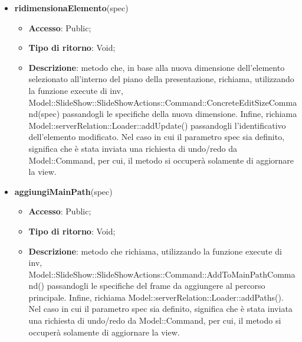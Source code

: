 {{\begin{itemize}
\begin{itemize}
			\item \textbf{Descrizione}: metodo che, in base al nuovo posizionamento dell'elemento selezionato all'interno del piano della presentazione, richiama, utilizzando la funzione execute di inv, Model::\-SlideShow::\-SlideShowActions::\-Command::\-ConcreteEditPositionCommand() passandogli le specifiche della nuova posizione. Infine, richiama Model::\-serverRelation::\-Loader::\-addUpdate() passandogli l'identificativo dell'elemento modificato. Nel caso in cui il parametro spec sia definito, significa che è stata inviata una richiesta di undo/redo da Model::\-Command, per cui, il metodo si occuperà solamente di aggiornare la view.
		\end{itemize}
		\item \textbf{ridimensionaElemento}(spec)
		\begin{itemize}
			\item \textbf{Accesso}: Public;
			\item \textbf{Tipo di ritorno}: Void;
			\item \textbf{Descrizione}: metodo che, in base alla nuova dimensione dell'elemento selezionato all'interno del piano della presentazione, richiama, utilizzando la funzione execute di inv, Model::\-SlideShow::\-SlideShowActions::\-Command::\-ConcreteEditSizeCommand(spec) passandogli le specifiche della nuova dimensione. Infine, richiama Model::\-serverRelation::\-Loader::\-addUpdate() passandogli l'identificativo dell'elemento modificato. Nel caso in cui il parametro spec sia definito, significa che è stata inviata una richiesta di undo/redo da Model::\-Command, per cui, il metodo si occuperà solamente di aggiornare la view.
		\end{itemize}
		\item \textbf{aggiungiMainPath}(spec)
		\begin{itemize}
			\item \textbf{Accesso}: Public;
			\item \textbf{Tipo di ritorno}: Void;
			\item \textbf{Descrizione}: metodo che richiama, utilizzando la funzione execute di inv, Model::\-SlideShow::\-SlideShowActions::\-Command::\-AddToMainPathCommand() passandogli le specifiche del frame da aggiungere al percorso principale. Infine, richiama Model::\-serverRelation::\-Loader::\-addPaths(). Nel caso in cui il parametro spec sia definito, significa che è stata inviata una richiesta di undo/redo da Model::\-Command, per cui, il metodo si occuperà solamente di aggiornare la view.
		\end{itemize}

\end{itemize}}}
